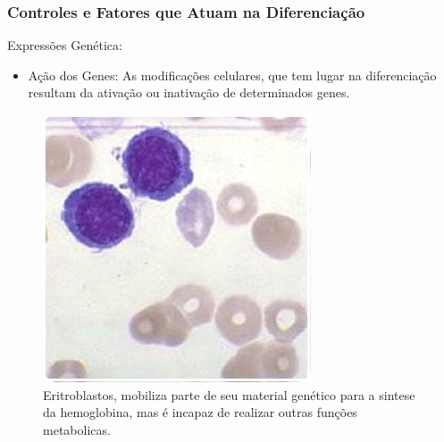 \documentclass[brazil]{beamer}
\begin{document}
\begin{frame}
  \frametitle{Controles e Fatores que Atuam na Diferenciação}
  \raggedright  
  \begin{block}{Expressões Genética:}
    \footnotesize 
      \begin{itemize}
     \item Ação dos Genes: As modificações celulares, que tem lugar na diferenciação resultam da ativação ou inativação de determinados genes. 
    \end{itemize}
    \end{block}
    \pause
    \begin{figure}
      \includegraphics[scale=0.5]{erito.jpg}
      \caption{\tiny Eritroblastos, mobiliza parte de seu material genético para a sintese da hemoglobina, mas é incapaz de realizar outras funções metabolicas.}
    \end{figure} 
\end{frame}
\end{document}
